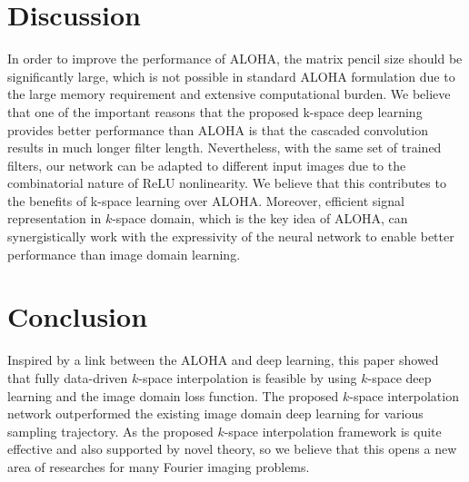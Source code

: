 \documentclass[10pt,journal]{IEEEtran}
\newcommand{\0}{{\boldsymbol{0}}}
\begin{document}
\section{Discussion}

In order to improve the performance of ALOHA, the matrix pencil size should be significantly large, which is not possible in standard ALOHA formulation due to the large memory requirement and extensive computational burden. 
We believe that one of the important reasons that the proposed k-space deep learning provides better performance than ALOHA is that  the cascaded convolution results in much longer filter length. Nevertheless, 
with the same set of trained filters, our network can  be adapted to different input images due to the
combinatorial nature of ReLU nonlinearity. We believe that this contributes to the benefits of k-space learning over ALOHA.
Moreover, efficient signal representation in  $k$-space domain, which is the key idea of ALOHA,  can 
synergistically work with the expressivity of the neural network to enable better performance than image domain learning.



\section{Conclusion}\label{sec:conclusion}

Inspired by a link between the ALOHA and deep learning,
this paper showed that fully data-driven $k$-space interpolation is feasible by using $k$-space deep learning
 and the image domain loss function. The proposed $k$-space interpolation network  outperformed the
existing image domain deep learning for various sampling trajectory.
As the proposed $k$-space interpolation framework is quite effective and also supported by novel theory, 
so we believe that this opens a new area of researches for many Fourier imaging problems.
\end{document}
